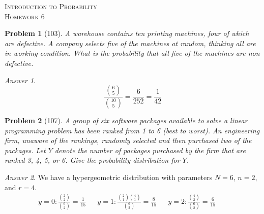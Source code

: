 \documentclass{article}
\theoremstyle{problem}
\newtheorem{prob}{Problem}
\theoremstyle{remark}
\newtheorem*{answer}{Answer}
\begin{document}
\begin{center}
  \textsc{\Large Introduction to Probability}\\[.3cm]
  \textsc{\Large Homework 6}
\end{center}

\begin{prob}[103]
A warehouse contains ten printing machines, four of which are defective. A company selects five of the machines at random, thinking all are in working condition. What is the probability that all five of the machines are non defective.
\end{prob}
\begin{answer}
$$
\frac{\displaystyle {6 \choose 5}}{\displaystyle {10 \choose 5}} = \frac{6}{252} = \frac{1}{42}
$$
\end{answer}
% 

\begin{prob}[107]
A group of six software packages available to solve a linear programming problem has been ranked from 1 to 6 (best to worst). An engineering firm, unaware of the rankings, randomly selected and then purchased two of the packages. Let $Y$ denote the number of packages purchased by the firm that are ranked 3, 4, 5, or 6. Give the probability distribution for $Y$.
\end{prob}
\begin{answer}
  We have a hypergeometric distribution with parameters $N = 6$, $n = 2$, and $r = 4$.
\begin{align*}
y = 0: \frac{\displaystyle {2 \choose 2}}{ \displaystyle {6 \choose 2}} = \frac{1}{15}&&
y = 1: \frac{\displaystyle {2 \choose 1} {4 \choose 1}}{ \displaystyle {6 \choose 2}} = \frac{8}{15}&&
y = 2: \frac{\displaystyle {4 \choose 2}}{ \displaystyle {6 \choose 2}} = \frac{6}{15}&&
\end{align*}
\end{answer}
% 
\end{document}
